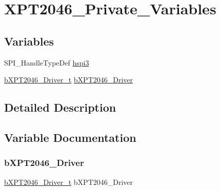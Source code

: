 \hypertarget{group___x_p_t2046___private___variables}{}\section{X\+P\+T2046\+\_\+\+Private\+\_\+\+Variables}
\label{group___x_p_t2046___private___variables}
\subsection*{Variables}
\begin{DoxyCompactItemize}
\item 
S\+P\+I\+\_\+\+Handle\+Type\+Def \mbox{\hyperlink{group___x_p_t2046___private___variables_gaec51920045aad7f70cbfd1f58228d866}{hspi3}}
\item 
\mbox{\hyperlink{group___x_p_t2046___exported___types_definitions_ga9851b9956c106dac31a925346a103871}{b\+X\+P\+T2046\+\_\+\+Driver\+\_\+t}} \mbox{\hyperlink{group___x_p_t2046___private___variables_ga2ed61e56408ad8fb94a4240811be42ff}{b\+X\+P\+T2046\+\_\+\+Driver}}
\end{DoxyCompactItemize}


\subsection{Detailed Description}


\subsection{Variable Documentation}
\mbox{\label{group___x_p_t2046___private___variables_ga2ed61e56408ad8fb94a4240811be42ff}} 
\subsubsection{\texorpdfstring{b\+X\+P\+T2046\+\_\+\+Driver}{bXPT2046\_Driver}}
{\footnotesize\ttfamily \mbox{\hyperlink{group___x_p_t2046___exported___types_definitions_ga9851b9956c106dac31a925346a103871}{b\+X\+P\+T2046\+\_\+\+Driver\+\_\+t}} b\+X\+P\+T2046\+\_\+\+Driver}

